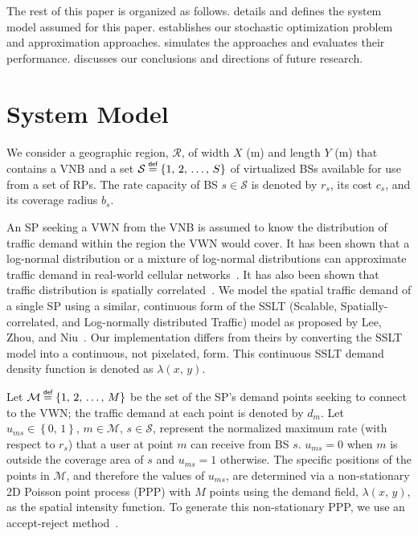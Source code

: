 \documentclass[conference]{IEEEtran}
\newcommand\defeq{\mathrel{\overset{\makebox[0pt]{\mbox{\normalfont\tiny\sffamily def}}}{=}}}
\begin{document}
The rest of this paper is organized as follows.   details and defines the system model assumed for this paper.   establishes our stochastic optimization problem and approximation approaches.   simulates the approaches and evaluates their performance.   discusses our conclusions and directions of future research.

\section{System Model} \label{sec:model}

We consider a geographic region, $\mathcal{R}$, of width $X$ (m) and length $Y$ (m) that contains a VNB and a set $\mathcal{S} \defeq \left\{ 1,\, 2,\, \ldots,\, S \right\}$ of virtualized BSs available for use from a set of RPs.  The rate capacity of BS $s \in \mathcal{S}$ is denoted by $r_s$, its cost $c_s$, and its coverage radius $b_s$.

An SP seeking a VWN from the VNB is assumed to know the distribution of traffic demand within the region the VWN would cover.  It has been shown that a log-normal distribution or a mixture of log-normal distributions can approximate traffic demand in real-world cellular networks~\cite{686105, 5936263}.  It has also been shown that traffic distribution is spatially correlated~\cite{5936263, eigenplaces}.  We model the spatial traffic demand of a single SP using a similar, continuous form of the SSLT (Scalable, Spatially-correlated, and Log-normally distributed Traffic) model as proposed by Lee, Zhou, and Niu~\cite{6554749}.  Our implementation differs from theirs by converting the SSLT model into a continuous, not pixelated, form.  This continuous SSLT demand density function is denoted as $\lambda \left( x,\, y \right)$.

Let $\mathcal{M} \defeq \left\{ 1,\, 2,\, \ldots,\, M \right\}$ be the set of the SP's demand points seeking to connect to the VWN; the traffic demand at each point is denoted by $d_m$.  Let $u_{ms} \in \left\{ 0,\, 1 \right\},\, m \in \mathcal{M},\, s \in \mathcal{S}$, represent the normalized maximum rate (with respect to $r_s$) that a user at point $m$ can receive from BS $s$.  $u_{ms} = 0$ when $m$ is outside the coverage area of $s$ and $u_{ms} = 1$ otherwise.  The specific positions of the points in $\mathcal{M}$, and therefore the values of $u_{ms}$, are determined via a non-stationary 2D Poisson point process (PPP) with $M$ points using the demand field, $\lambda \left( x,\, y \right)$, as the spatial intensity function.  To generate this non-stationary PPP, we use an accept-reject method~\cite{leeds:nsPPPgeneration}.
\end{document}
